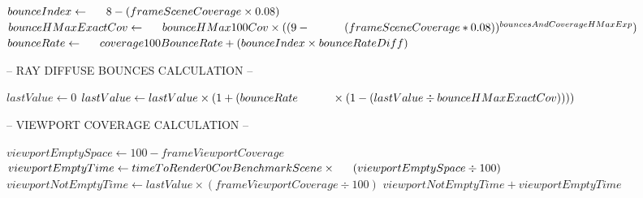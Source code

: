 ﻿\documentclass{article}
\begin{document}
\begin{algorithm}
\begin{algorithmic}[1]
            \State $bounceIndex \gets \newline \indent 8 - (frameSceneCoverage \times 0.08)$
            \State $bounceHMaxExactCov \gets \newline \indent bounceHMax100Cov \times ((9 - \newline \indent \indent (frameSceneCoverage * 0.08)) ^ {bouncesAndCoverageHMaxExp})$
            \State $bounceRate \gets \newline \indent coverage100BounceRate + (bounceIndex \times bounceRateDiff)$
            \newline
            \newline
            \iftrue
            -- RAY DIFFUSE BOUNCES CALCULATION --
            \fi
            \newline
            \State $lastValue \gets 0$
                \State $lastValue \gets lastValue \times (1 + (bounceRate \newline \indent \indent \times (1 - (lastValue \div bounceHMaxExactCov))))$
            \EndFor
            \newline
            \newline
            \iftrue
            -- VIEWPORT COVERAGE CALCULATION --
            \fi
            \newline
            \State $viewportEmptySpace \gets 100 - frameViewportCoverage$
            \State $viewportEmptyTime \gets timeToRender0CovBenchmarkScene \times \newline \indent (viewportEmptySpace \div 100)$
            \State $viewportNotEmptyTime \gets lastValue \times (frameViewportCoverage \div 100)$
            \Return $viewportNotEmptyTime + viewportEmptyTime$
        \end{algorithmic}
    \end{algorithm}
\end{document}

